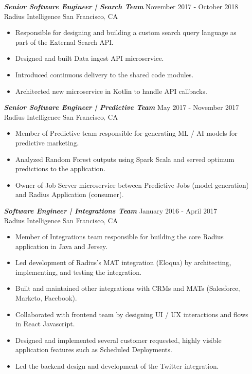 \documentclass[overlapped, 10pt]{res} %
\begin{document}
\begin{resume}
{\sl \textbf{Senior Software Engineer | Search Team}} \hfill November 2017 - October 2018 \\
Radius Intelligence \hfill San Francisco, CA
\begin{itemize} \itemsep -1pt %
\item Responsible for designing and building a custom search query language as part of the External Search API.
\item Designed and built Data ingest API microservice.
\item Introduced continuous delivery to the shared code modules.
\item Architected new microservice in Kotlin to handle API callbacks.
\end{itemize} 

{\sl \textbf{Senior Software Engineer | Predictive Team}} \hfill May 2017 - November 2017 \\
Radius Intelligence \hfill San Francisco, CA
\begin{itemize} \itemsep -1pt %
\item Member of Predictive team responsible for generating ML / AI models for predictive marketing.
\item Analyzed Random Forest outputs using Spark Scala and served optimum predictions to the application.
\item Owner of Job Server microservice between Predictive Jobs (model generation) and Radius Application (consumer).
\end{itemize} 

{\sl \textbf{Software Engineer | Integrations Team}} \hfill January 2016 - April 2017 \\
Radius Intelligence \hfill San Francisco, CA
\begin{itemize} \itemsep -1pt %
\item Member of Integrations team responsible for building the core Radius application in Java and Jersey.
\item Led development of Radius’s MAT integration (Eloqua) by architecting, implementing, and testing the integration.
\item Built and maintained other integrations with CRMs and MATs (Salesforce, Marketo, Facebook).
\item Collaborated with frontend team by designing UI / UX interactions and flows in React Javascript.
\item Designed and implemented several customer requested, highly visible application features such as Scheduled Deployments.
\item Led the backend design and development of the Twitter integration.
\end{itemize}
 

\end{resume}
\end{document}
